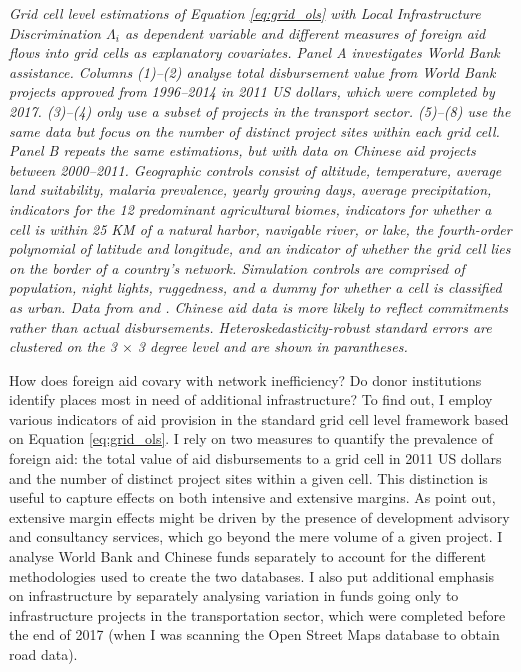 \documentclass[11pt, oneside]{article}   	%
\newcommand{\mysubcaption}[1]{
\justify
\begin{spacing}{0.7}
\textit{\footnotesize #1}
\end{spacing}}
\begin{document}
\begin{table}[!t]
\mysubcaption{Grid cell level estimations of Equation \eqref{eq:grid_ols} with Local Infrastructure Discrimination $\Lambda_{i}$ as dependent variable and different measures of foreign aid flows into grid cells as explanatory covariates. Panel A investigates World Bank assistance. Columns (1)--(2) analyse total disbursement value from World Bank projects approved from 1996--2014 in 2011 US dollars, which were completed by 2017. (3)--(4) only use a subset of projects in the transport sector. (5)--(8) use the same data but focus on the number of distinct project sites within each grid cell. Panel B repeats the same estimations, but with data on Chinese aid projects between 2000--2011. Geographic controls consist of altitude, temperature, average land suitability, malaria prevalence, yearly growing days, average precipitation, indicators for the 12 predominant agricultural biomes, indicators for whether a cell is within 25 KM of a natural harbor, navigable river, or lake, the fourth-order polynomial of latitude and longitude, and an indicator of whether the grid cell lies on the border of a country's network. Simulation controls are comprised of population, night lights, ruggedness, and a dummy for whether a cell is classified as urban. Data from \cite{AidData_WorldBankGeocoded_2017} and \cite{Strange_TrackingUnderreportedFinancial_2017}. Chinese aid data is more likely to reflect commitments rather than actual disbursements. Heteroskedasticity-robust standard errors are clustered on the 3 $\times$ 3 degree level and are shown in parantheses.}
\end{table}

How does foreign aid covary with network inefficiency? Do donor institutions identify places most in need of additional infrastructure? To find out, I employ various indicators of aid provision in the standard grid cell level framework based on Equation \eqref{eq:grid_ols}. I rely on two measures to quantify the prevalence of foreign aid: the total value of aid disbursements to a grid cell in 2011 US dollars and the number of distinct project sites within a given cell. This distinction is useful to capture effects on both intensive and extensive margins. As \cite{Dreher_Aidgrowthregional_2015} point out, extensive margin effects might be driven by the presence of development advisory and consultancy services, which go beyond the mere volume of a given project. I analyse World Bank and Chinese funds separately to account for the different methodologies used to create the two databases. I also put additional emphasis on infrastructure by separately analysing variation in funds going only to infrastructure projects in the transportation sector, which were completed before the end of 2017 (when I was scanning the Open Street Maps database to obtain road data).
\end{document}
